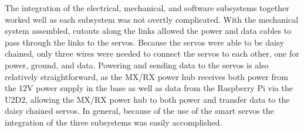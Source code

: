 The integration of the electrical, mechanical, and software subsystems together worked well as each subsystem was not overtly complicated. With the mechanical system assembled, cutouts along the links allowed the power and data cables to pass through the links to the servos. Because the servos were able to be daisy chained, only three wires were needed to connect the servos to each other, one for power, ground, and data. Powering and sending data to the servos is also relatively straightforward, as the MX/RX power hub receives both power from the 12V power supply in the base as well as data from the Raspberry Pi via the U2D2, allowing the MX/RX power hub to both power and transfer data to the daisy chained servos. In general, because of the use of the smart servos the integration of the three subsystems was easily accomplished.
